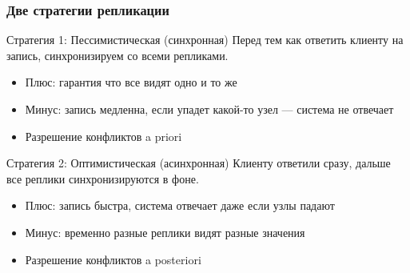 \documentclass{beamer}
\begin{document}
\begin{frame}
\frametitle{Две стратегии репликации}

\begin{block}{Стратегия 1: Пессимистическая (синхронная)}
Перед тем как ответить клиенту на запись, синхронизируем со всеми репликами.
\begin{itemize}
  \item Плюс: гарантия что все видят одно и то же
  \item Минус: запись медленна, если упадет какой-то узел — система не отвечает
  \item Разрешение конфликтов a priori
\end{itemize}
\end{block}

\begin{block}{Стратегия 2: Оптимистическая (асинхронная)}
Клиенту ответили сразу, дальше все реплики синхронизируются в фоне.
\begin{itemize}
  \item Плюс: запись быстра, система отвечает даже если узлы падают
  \item Минус: временно разные реплики видят разные значения
  \item Разрешение конфликтов a posteriori
\end{itemize}
\end{block}

\end{frame}
\end{document}
